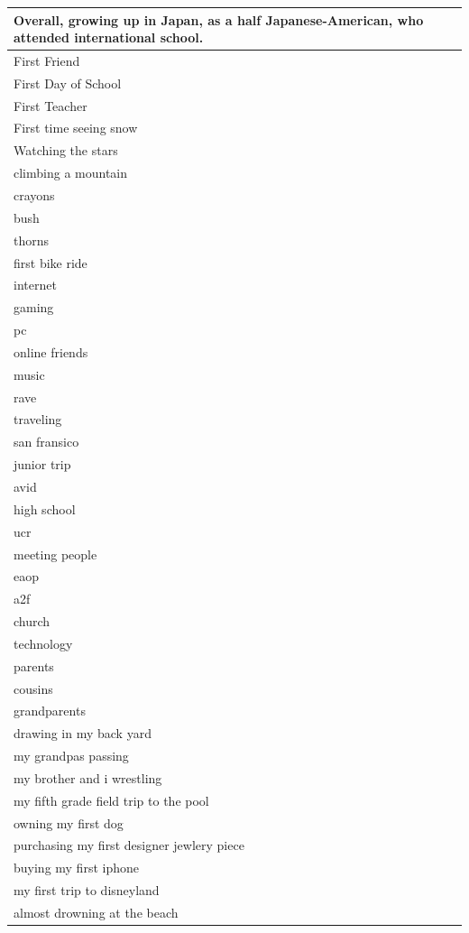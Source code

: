 \documentclass[
  .7em,
  letterpaper,
  DIV=11,
  numbers=noendperiod]{scrartcl}
\begin{document}
\begin{table}
\begin{tabular}{l}
\hline
Overall, growing up in Japan, as a half Japanese-American, who attended international school.\\
\hline
First Friend\\
\hline
First Day of School\\
\hline
First Teacher\\
\hline
First time seeing snow\\
\hline
Watching the stars\\
\hline
climbing a mountain\\
\hline
crayons\\
\hline
bush\\
\hline
thorns\\
\hline
first bike ride\\
\hline
internet\\
\hline
gaming\\
\hline
pc\\
\hline
online friends\\
\hline
music\\
\hline
rave\\
\hline
traveling\\
\hline
san fransico\\
\hline
junior trip\\
\hline
avid\\
\hline
high school\\
\hline
ucr\\
\hline
meeting people\\
\hline
eaop\\
\hline
a2f\\
\hline
church\\
\hline
technology\\
\hline
parents\\
\hline
cousins\\
\hline
grandparents\\
\hline
drawing in my back yard\\
\hline
my grandpas passing\\
\hline
my brother and i wrestling\\
\hline
my fifth grade field trip to the pool\\
\hline
owning my first dog\\
\hline
purchasing my first designer jewlery piece\\
\hline
buying my first iphone\\
\hline
my first trip to disneyland\\
\hline
almost drowning at the beach\\

\end{tabular}
\end{table}
\end{document}
